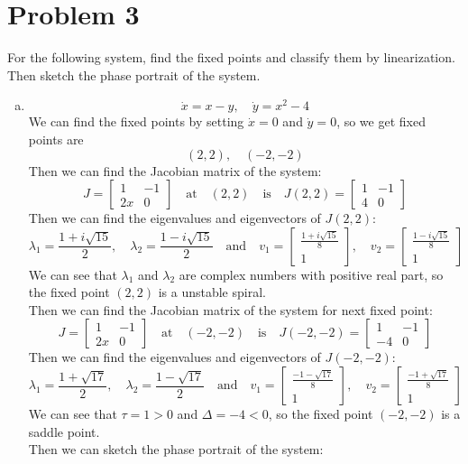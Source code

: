 \documentclass[12pt]{exam}
\begin{document}
\section*{Problem 3}
For the following system, find the fixed points and classify them by linearization. Then sketch the phase portrait of the system.

\begin{enumerate}[(a)]
	\item \[ \dot{x} = x-y, \quad \dot{y} = x^2-4 \]
	We can find the fixed points by setting $\dot{x} = 0$ and $\dot{y} = 0$, so we get fixed points are
	\[ (2,2), \quad (-2,-2) \]
	Then we can find the Jacobian matrix of the system:
	\[ J = \begin{bmatrix}
		1 & -1 \\
		2x & 0
		\end{bmatrix} \quad \text{at} \quad (2,2) \quad \text{is} \quad J(2,2) = \begin{bmatrix}		1 & -1 \\
		4 & 0
		\end{bmatrix} \]
	Then we can find the eigenvalues and eigenvectors of $J(2,2)$:
	\[ \lambda_1 = \frac{1+i\sqrt{15}}{2}, \quad \lambda_2 = \frac{1-i\sqrt{15}}{2} \quad \text{and} \quad v_1 = \begin{bmatrix}
		\frac{1+i\sqrt{15}}{8} \\
		1
	\end{bmatrix}, \quad v_2 = \begin{bmatrix}
		\frac{1-i\sqrt{15}}{8} \\
		1
	\end{bmatrix} \]
	We can see that $\lambda_1$ and $\lambda_2$ are complex numbers with positive real part, so the fixed point $(2,2)$ is a unstable spiral. \\
	Then we can find the Jacobian matrix of the system for next fixed point:
	\[ J = \begin{bmatrix}
		1 & -1 \\
		2x & 0
		\end{bmatrix} \quad \text{at} \quad (-2,-2) \quad \text{is} \quad J(-2,-2) = \begin{bmatrix}		1 & -1 \\
		-4 & 0
		\end{bmatrix} \]
	Then we can find the eigenvalues and eigenvectors of $J(-2,-2)$:
	\[ \lambda_1 = \frac{1+\sqrt{17}}{2}, \quad \lambda_2 = \frac{1-\sqrt{17}}{2} \quad \text{and} \quad v_1 = \begin{bmatrix}
		\frac{-1-\sqrt{17}}{8} \\
		1
	\end{bmatrix}, \quad v_2 = \begin{bmatrix}
		\frac{-1+\sqrt{17}}{8} \\
		1
	\end{bmatrix} \]
	We can see that $\tau = 1 > 0$ and $\Delta = -4 < 0$, so the fixed point $(-2,-2)$ is a saddle point. \\
	Then we can sketch the phase portrait of the system:	




\end{enumerate}
\end{document}
